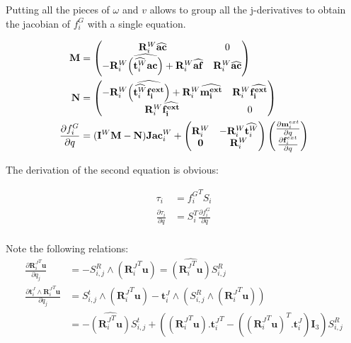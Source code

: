 Putting all the pieces of $\omega$ and $v$ allows to group all the j-derivatives to obtain the jacobian of $f^G_i$ with a single equation.

\begin{align}
  \bf M &=
  \begin{pmatrix}
    \mathbf{R}^W_i \widehat{\bf ac}  & 0\\
    -{\mathbf{R}^W_i}\widehat{\left(\widehat{\mathbf{t}^W_i}\bf ac \right)}
    + \mathbf{R}^W_i \widehat{\bf af}  & {\mathbf{R}^W_i}\widehat{\bf ac} \\
  \end{pmatrix}
  \\
  \bf N &=
  \begin{pmatrix}
    - {\mathbf{R}^W_i}\widehat{\left(\widehat{\mathbf{t}^W_i}\bf \mathbf{f}^{ext}_i \right)} + \mathbf{R}^W_i \widehat{\bf \mathbf{m}^{ext}_i} & {\mathbf{R}^W_i}\widehat{\bf \mathbf{f}^{ext}_i} \\
    \mathbf{R}^W_i \widehat{\bf \mathbf{f}^{ext}_i} & 0\\
  \end{pmatrix}
  \\
  \frac{\partial f^G_i}{\partial q} &= (\mathbf{I}^W \mathbf{M} - \mathbf{N})\mathbf{Jac}^W_i
  +
  \begin{pmatrix}
    {\mathbf{R}^W_i} & -{\mathbf{R}^W_i}\widehat{\mathbf{t}^W_i} \\
    \mathbf{0} & {\mathbf{R}^W_i} \\
  \end{pmatrix}
  \begin{pmatrix}
    \frac{\partial \mathbf{m}^{ext}_i}{\partial q} \\ \frac{\partial \mathbf{f}^{ext}_i}{\partial q}
  \end{pmatrix}
\end{align}

The derivation of the second equation is obvious:

\begin{align}
  \tau_i &= {f^G_i}^T S_i \\
  \frac{\partial \tau_i}{\partial q} &= S_i^T \frac{\partial f^G_i}{\partial q} \\
\end{align}

Note the following relations:
\begin{align}
  \frac{\partial {\mathbf{R}_i^J}^T \mathbf{u}}{\partial q_j}
  &= - S^R_{i,j} \wedge ({\mathbf{R}_i^J}^T \mathbf{u})
  = \widehat{({\mathbf{R}_i^J}^T \mathbf{u})} S^R_{i,j}
  \\
  \frac{\partial\mathbf{t}^J_i\wedge {\mathbf{R}_i^J}^T  \mathbf{u}}{\partial q_j}
  &= S^t_{i,j} \wedge \left({\mathbf{R}_i^J}^T \mathbf{u}\right)
  - \mathbf{t}^J_i \wedge \left( S^R_{i,j} \wedge \left({\mathbf{R}_i^J}^T \mathbf{u}\right)\right) \\
  &= -\widehat{({\mathbf{R}_i^J}^T \mathbf{u})} S^t_{i,j}
  + \left(\left({\mathbf{R}_i^J}^T \mathbf{u}\right) . {\mathbf{t}^J_i}^T
  - \left( ({\mathbf{R}_i^J}^T \mathbf{u})^T . \mathbf{t}^J_i\right) \mathbf{I}_3\right)S_{i,j}^R\\
\end{align}

